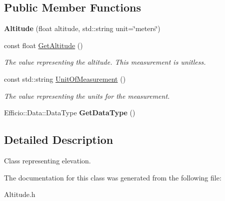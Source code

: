 \subsection*{Public Member Functions}
\begin{DoxyCompactItemize}
\item 
{\bfseries Altitude} (float altitude, std\+::string unit=\char`\"{}meters\char`\"{})\hypertarget{class_efficio_1_1_data_1_1_positional_1_1_altitude_a38d0f85abfd177bd4d2986393ca607b9}{}\label{class_efficio_1_1_data_1_1_positional_1_1_altitude_a38d0f85abfd177bd4d2986393ca607b9}

\item 
const float \hyperlink{class_efficio_1_1_data_1_1_positional_1_1_altitude_ae59bb8cdeff5bf7b61c0e690c475b415}{Get\+Altitude} ()\hypertarget{class_efficio_1_1_data_1_1_positional_1_1_altitude_ae59bb8cdeff5bf7b61c0e690c475b415}{}\label{class_efficio_1_1_data_1_1_positional_1_1_altitude_ae59bb8cdeff5bf7b61c0e690c475b415}

\begin{DoxyCompactList}\small\item\em The value representing the altitude. This measurement is unitless. \end{DoxyCompactList}\item 
const std\+::string \hyperlink{class_efficio_1_1_data_1_1_positional_1_1_altitude_a1ebb1e216cdb6b5acefbb00bc7dc1495}{Unit\+Of\+Measurement} ()\hypertarget{class_efficio_1_1_data_1_1_positional_1_1_altitude_a1ebb1e216cdb6b5acefbb00bc7dc1495}{}\label{class_efficio_1_1_data_1_1_positional_1_1_altitude_a1ebb1e216cdb6b5acefbb00bc7dc1495}

\begin{DoxyCompactList}\small\item\em The value representing the units for the measurement. \end{DoxyCompactList}\item 
Efficio\+::\+Data\+::\+Data\+Type {\bfseries Get\+Data\+Type} ()\hypertarget{class_efficio_1_1_data_1_1_positional_1_1_altitude_aa4a7a091ebca10a068b85fc361eddd02}{}\label{class_efficio_1_1_data_1_1_positional_1_1_altitude_aa4a7a091ebca10a068b85fc361eddd02}

\end{DoxyCompactItemize}


\subsection{Detailed Description}
Class representing elevation. 

The documentation for this class was generated from the following file\+:\begin{DoxyCompactItemize}
\item 
Altitude.\+h\end{DoxyCompactItemize}
